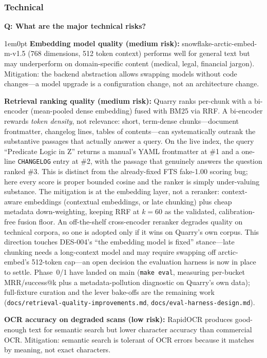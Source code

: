 \documentclass[11pt,letterpaper]{article}
\newcounter{faqnum}
\newenvironment{faqpair}[1]{%
  \needspace{4\baselineskip}%
  \vspace{0.5em}%
  \refstepcounter{faqnum}%
  \noindent\textbf{\color{SectionBlue}Q\thefaqnum: #1}\par\nopagebreak[4]%
  \vspace{0.2em}%
  \begin{adjustwidth}{1em}{0pt}%
  \setlength{\parindent}{0pt}%
}{%
  \end{adjustwidth}%
  \vspace{0.5em}%
}
\begin{document}
\subsubsection*{Technical}

\begin{faqpair}{What are the major technical risks?}\label{faq:tech-risks}
  \textbf{Embedding model quality (medium risk):} snowflake-arctic-embed-m-v1.5
  (768 dimensions, 512 token context) performs well for general text but may
  underperform on domain-specific content (medical, legal, financial jargon).
  Mitigation: the backend abstraction allows swapping models without code
  changes---a model upgrade is a configuration change, not an architecture change.

  \textbf{Retrieval ranking quality (medium risk):} Quarry ranks per-chunk with
  a bi-encoder (mean-pooled dense embedding) fused with BM25 via RRF. A
  bi-encoder rewards \emph{token density}, not relevance: short, term-dense
  chunks---document frontmatter, changelog lines, tables of contents---can
  systematically outrank the substantive passages that actually answer a query.
  On the live index, the query ``Predicate Logic in Z'' returns a manual's YAML
  frontmatter at \#1 and a one-line \texttt{CHANGELOG} entry at \#2, with the
  passage that genuinely answers the question ranked \#3. This is distinct from
  the already-fixed FTS fake-1.00 scoring bug; here every score is proper bounded
  cosine and the ranker is simply under-valuing substance. The mitigation is at
  the embedding layer, not a reranker: context-aware embeddings (contextual
  embeddings, or late chunking) plus cheap metadata down-weighting, keeping RRF
  at $k=60$ as the validated, calibration-free fusion floor. An off-the-shelf
  cross-encoder reranker degrades quality on technical corpora, so one is adopted
  only if it wins on Quarry's own corpus. This direction touches DES-004's ``the
  embedding model is fixed'' stance---late chunking needs a long-context model
  and may require swapping off arctic-embed's 512-token cap---an open decision
  the evaluation harness is now in place to settle. Phase~0/1 have landed on main
  (\texttt{make eval}, measuring per-bucket MRR/success@k plus a
  metadata-pollution diagnostic on Quarry's own data); full-fixture curation and
  the lever bake-offs are the remaining work
  (\texttt{docs/retrieval-quality-improvements.md},
  \texttt{docs/eval-harness-design.md}).

  \textbf{OCR accuracy on degraded scans (low risk):} RapidOCR produces
  good-enough text for semantic search but lower character accuracy than
  commercial OCR. Mitigation: semantic search is tolerant of OCR errors
  because it matches by meaning, not exact characters.


\end{faqpair}
\end{document}
